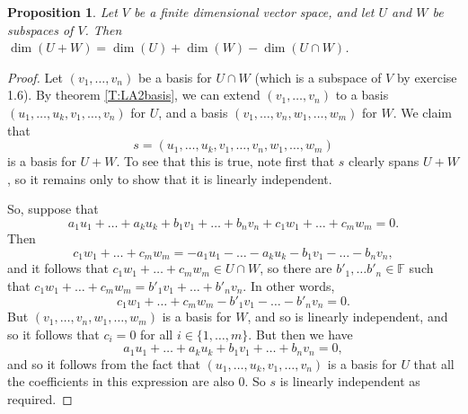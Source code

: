 \documentclass{article}
\theoremstyle{plain}
\newtheorem{proposition}[theorem]{Proposition}{\bfseries}{\itshape}
\newcommand{\bF}{\mathbb{F}}
\begin{document}
\begin{proposition}
Let $V$ be a finite dimensional vector space, and let $U$ and $W$ be subspaces of $V$. Then $\dim(U+W)= \dim(U) +\dim(W) - \dim(U\cap W)$.
\end{proposition}
\begin{proof}
Let $(v_1,\ldots,v_n)$ be a basis for $U\cap W$ (which is a  subspace of $V$ by exercise 1.6). By theorem \ref{T:LA2basis}, we can extend $(v_1,\ldots,v_n)$ to a basis $(u_1,\ldots,u_k,v_1,\ldots,v_n)$ for $U$, and a basis $(v_1,\ldots,v_n, w_1,\ldots, w_m)$ for $W$. We claim that 
\[s=(u_1,\ldots,u_k,v_1,\ldots,v_n, w_1,\ldots, w_m)\] 
is a basis for $U+W$. To see that this is true, note first that $s$ clearly spans $U+W$, so it remains only to show that it is linearly independent.

So, suppose that 
\[a_1u_1+\ldots + a_k u_k + b_1v_1+\ldots+ b_nv_n+ c_1w_1+\ldots+ c_mw_m = 0.\]
Then 
\[c_1w_1+\ldots+ c_mw_m = -a_1u_1-\ldots - a_k u_k - b_1v_1-\ldots- b_nv_n,\]
and it follows that $c_1w_1+\ldots+ c_mw_m\in U\cap W$, so there are $b'_1,\ldots b'_n\in\bF$ such that $c_1w_1+\ldots+ c_mw_m = b'_1v_1+\ldots+ b'_nv_n$. In other words,
\[c_1w_1+\ldots+ c_mw_m - b'_1v_1-\ldots- b'_nv_n = 0.\]
But $(v_1,\ldots,v_n, w_1,\ldots, w_m)$ is a basis for $W$, and so is linearly independent, and so it follows that $c_i = 0$ for all $i\in \{1,\ldots,m\}$. But then we have 
\[a_1u_1+\ldots + a_k u_k + b_1v_1+\ldots+ b_nv_n = 0,\]
and so it follows from the fact that $(u_1,\ldots,u_k,v_1,\ldots,v_n)$ is a basis for $U$ that all the coefficients in this expression are also 0. So $s$ is linearly independent as required.      
\end{proof}
\end{document}
